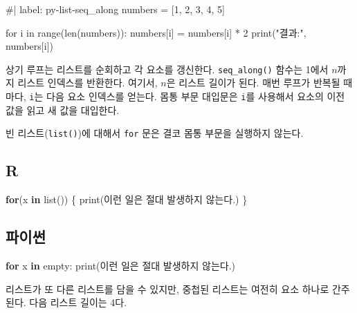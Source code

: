 \documentclass[
  letterpaper,
]{book}
\newenvironment{Shaded}{\begin{snugshade}}{\end{snugshade}}
\newcommand{\BuiltInTok}[1]{\textcolor[rgb]{0.00,0.23,0.31}{#1}}
\newcommand{\ControlFlowTok}[1]{\textcolor[rgb]{0.00,0.23,0.31}{\textbf{#1}}}
\newcommand{\FunctionTok}[1]{\textcolor[rgb]{0.28,0.35,0.67}{#1}}
\newcommand{\KeywordTok}[1]{\textcolor[rgb]{0.00,0.23,0.31}{\textbf{#1}}}
\newcommand{\NormalTok}[1]{\textcolor[rgb]{0.00,0.23,0.31}{#1}}
\newcommand{\StringTok}[1]{\textcolor[rgb]{0.13,0.47,0.30}{#1}}
\begin{document}
\begin{Shaded}
\begin{Highlighting}[]
\NormalTok{\#| label: py{-}list{-}seq\_along}
\NormalTok{numbers = [1, 2, 3, 4, 5]}

\NormalTok{for i in range(len(numbers)):}
\NormalTok{    numbers[i] = numbers[i] * 2}
\NormalTok{    print("결과:", numbers[i])}
\end{Highlighting}
\end{Shaded}

상기 루프는 리스트를 순회하고 각 요소를 갱신한다. \texttt{seq\_along()}
함수는 1에서 \(n\)까지 리스트 인덱스를 반환한다. 여기서, \(n\)은 리스트
길이가 된다. 매번 루프가 반복될 때마다, \texttt{i}는 다음 요소 인덱스를
얻는다. 몸통 부문 대입문은 \texttt{i}를 사용해서 요소의 이전 값을 읽고
새 값을 대입한다.  

빈 리스트(\texttt{list()})에 대해서 \texttt{for} 문은 결코 몸통 부문을
실행하지 않는다.

\subsection*{R}\label{r-51}

\begin{Shaded}
\begin{Highlighting}[]
\ControlFlowTok{for}\NormalTok{(x }\ControlFlowTok{in} \FunctionTok{list}\NormalTok{()) \{}
  \FunctionTok{print}\NormalTok{(}\StringTok{\textquotesingle{}이런 일은 절대 발생하지 않는다.\textquotesingle{}}\NormalTok{)}
\NormalTok{\}}
\end{Highlighting}
\end{Shaded}

\subsection*{파이썬}\label{uxd30cuxc774uxc36c-51}

\begin{Shaded}
\begin{Highlighting}[]
\ControlFlowTok{for}\NormalTok{ x }\KeywordTok{in}\NormalTok{ empty:}
    \BuiltInTok{print}\NormalTok{(}\StringTok{\textquotesingle{}이런 일은 절대 발생하지 않는다.\textquotesingle{}}\NormalTok{)}
\end{Highlighting}
\end{Shaded}

리스트가 또 다른 리스트를 담을 수 있지만, 중첩된 리스트는 여전히 요소
하나로 간주된다. 다음 리스트 길이는 4다. 
\end{document}
